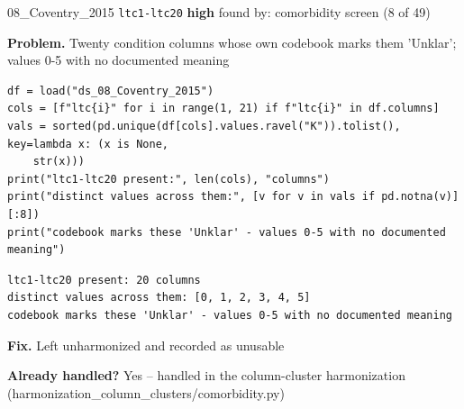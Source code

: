 \documentclass[9pt, t, handout]{beamer}
\newcommand{\ans}[1]{\textcolor{structure.fg}{#1}}
\begin{document}
\begin{frame}[fragile]{08\_Coventry\_2015 \quad \texttt{ltc1-ltc20}}
  {\scriptsize\textcolor{orange!80!black}{\textbf{high}} \quad
   found by: comorbidity screen \quad (8 of 49)}
  \vspace{3pt}

  {\footnotesize \textbf{Problem.} Twenty condition columns whose own codebook marks them 'Unklar'; values 0-5 with no documented meaning}
  \vspace{4pt}

  \begin{Verbatim}[fontsize=\tiny, frame=single, framesep=2pt, label=\tiny reproduce]
df = load("ds_08_Coventry_2015")
cols = [f"ltc{i}" for i in range(1, 21) if f"ltc{i}" in df.columns]
vals = sorted(pd.unique(df[cols].values.ravel("K")).tolist(), key=lambda x: (x is None, 
    str(x)))
print("ltc1-ltc20 present:", len(cols), "columns")
print("distinct values across them:", [v for v in vals if pd.notna(v)][:8])
print("codebook marks these 'Unklar' - values 0-5 with no documented meaning")
  \end{Verbatim}
  \begin{Verbatim}[fontsize=\tiny, frame=single, framesep=2pt, label=\tiny output]
ltc1-ltc20 present: 20 columns
distinct values across them: [0, 1, 2, 3, 4, 5]
codebook marks these 'Unklar' - values 0-5 with no documented meaning
  \end{Verbatim}
  \vspace{2pt}

  {\footnotesize \textbf{Fix.} Left unharmonized and recorded as unusable}
  \vspace{2pt}

  {\footnotesize \textbf{Already handled?} \ans{Yes} -- handled in the column-cluster harmonization
   (harmonization\_column\_clusters/comorbidity.py)}
\end{frame}
\end{document}
